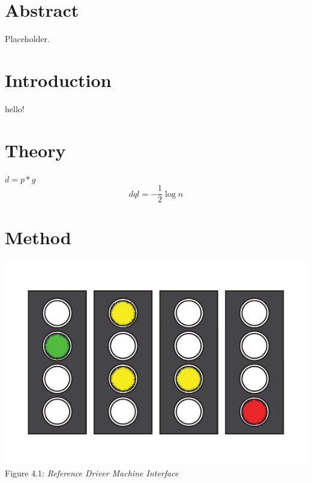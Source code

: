 \documentclass[twoside,12pt,a4paper]{article}
\begin{document}
\clearpage
\maketitle
\vspace{-5.5em}
\begingroup
\fontsize{9pt}{11pt}\selectfont
\tableofcontents
\endgroup
\clearpage
{}

\section{Abstract}
Placeholder.

\section{Introduction}
hello! \citep{RailExecutive14a}

\section{Theory}
$ d = p * g $
\[ dql = - \frac{1}{2} \log n \]

\section{Method}
\begin{center}
    \includegraphics[scale=.25]{Signals-eps-converted-to.pdf}\\
    Figure 4.1: \textit{Reference Driver Machine Interface \citep{RailExecutive14a}}
\end{center}
\end{document}

